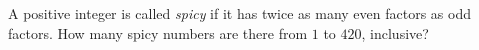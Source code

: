 A positive integer is called \emph{spicy} if it has twice as many even factors as odd factors. How many spicy numbers are there from $1$ to $420$, inclusive?
